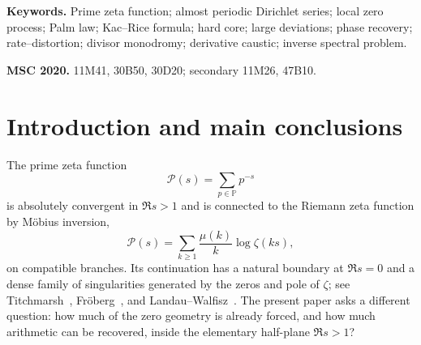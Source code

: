 \documentclass[11pt]{article}
\theoremstyle{definition}
\theoremstyle{remark}
\newcommand{\PP}{\mathbb P}
\newcommand{\cP}{\mathcal P}
\begin{document}
\begin{abstract}
The phase defect also converts the outer-edge large-deviation theorem into an
exact density--fidelity frontier.  If $\mathcal C(d)$ is the vertical intensity
of zeros whose weighted relative-phase distortion is at most $d$, then, with
$\beta_{\rm e}=(\sigma_{\rm e}-1)^{-1}$ and
$\ell_d=\log(2/d)$,
\[
 -\log\mathcal C(d)
 =K_{\rm e}(d/2)^{-\beta_{\rm e}}\ell_d^{-(1+\beta_{\rm e})}
 \left(1+(1+\beta_{\rm e})\frac{\log\ell_d}{\ell_d}
 +O(\ell_d^{-1})\right).
\]
This is a limiting-intensity theorem, not a first-occurrence estimate.  Its
finite-prime consequence is stated only as a sufficient reconstruction
certificate.

Finally, the quantized $a\to0$ escape law is lifted from measures to divisors.
On every compact subband of the hard-core region, the bounded $a$-point divisor
consists of uniformly separated holomorphic continuations of the zero divisor;
a zero-free corridor separates these persistent branches from a far-right
logarithmic lattice.  A loop around $a=0$ fixes every persistent branch and
acts by a unit shift on the escaping lattice.  The escape mass and reciprocal lattice spacing---equivalently, the physical
displacement of one monodromy shift---recover the least support prime, while
the bounded mass has an even $C^\infty$ expansion in $|a|$.

The paper also classifies the internal dominance bands of the derivative tower
and its moving-order zero lattices.  It proves no statement across
$\Re s=1$ and no new case of the Riemann hypothesis, Montgomery's
pair-correlation conjecture, or a prime-gap conjecture.
\end{abstract}

\tableofcontents
\vspace{0.5em}
\noindent\textbf{Keywords.}
Prime zeta function; almost periodic Dirichlet series; local zero process; Palm law;
Kac--Rice formula; hard core; large deviations; phase recovery; rate--distortion;
divisor monodromy; derivative caustic; inverse spectral problem.

\medskip
\noindent\textbf{MSC 2020.}
11M41, 30B50, 30D20; secondary 11M26, 47B10.

\clearpage
{}

\section{Introduction and main conclusions}
\label{sec:introduction}

The prime zeta function
\[
 \cP(s)=\sum_{p\in\PP}p^{-s}
\]
is absolutely convergent in $\Re s>1$ and is connected to the Riemann zeta function by
M\"obius inversion,
\[
 \cP(s)=\sum_{k\ge1}\frac{\mu(k)}{k}\log\zeta(ks),
\]
on compatible branches.  Its continuation has a natural boundary at $\Re s=0$ and a
dense family of singularities generated by the zeros and pole of $\zeta$; see
Titchmarsh~\cite{Titchmarsh1986}, Fr\"oberg~\cite{Froberg1968}, and
Landau--Walfisz~\cite{LandauWalfisz1920}.
The present paper asks a different question: how much of the zero geometry is already
forced, and how much arithmetic can be recovered, inside the elementary half-plane
$\Re s>1$?
\end{document}
